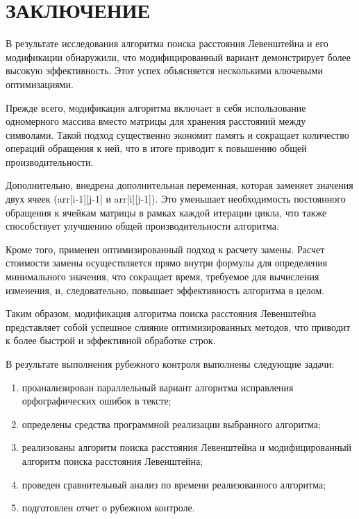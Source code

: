 \chapter*{\hfill{\centering ЗАКЛЮЧЕНИЕ}\hfill}

В результате исследования алгоритма поиска расстояния Левенштейна и его модификации обнаружили, что модифицированный вариант демонстрирует более высокую эффективность. 
Этот успех объясняется несколькими ключевыми оптимизациями.

Прежде всего, модификация алгоритма включает в себя использование одномерного массива вместо матрицы для хранения расстояний между символами. 
Такой подход существенно экономит память и сокращает количество операций обращения к ней, что в итоге приводит к повышению общей производительности.

Дополнительно, внедрена дополнительная переменная, которая заменяет значения двух ячеек (arr[i-1][j-1] и arr[i][j-1]). 
Это уменьшает необходимость постоянного обращения к ячейкам матрицы в рамках каждой итерации цикла, что также способствует улучшению общей производительности алгоритма.

Кроме того, применен оптимизированный подход к расчету замены. 
Расчет стоимости замены осуществляется прямо внутри формулы для определения минимального значения, что сокращает время, требуемое для вычисления изменения, и, следовательно, повышает эффективность алгоритма в целом.

Таким образом, модификация алгоритма поиска расстояния Левенштейна представляет собой успешное слияние оптимизированных методов, что приводит к более быстрой и эффективной обработке строк.

В результате выполнения рубежного контроля выполнены следующие задачи:

\begin{enumerate}[label={\arabic*)}]
	\item проанализирован параллельный вариант алгоритма исправления орфографических ошибок в тексте;
	\item определены средства программной реализации выбранного алгоритма;
	\item реализованы алгоритм поиска расстояния Левенштейна и модифицированный алгоритм поиска расстояния Левенштейна;
	\item проведен сравнительный анализ по времени реализованного алгоритма;
	\item подготовлен отчет о рубежном контроле.
\end{enumerate}